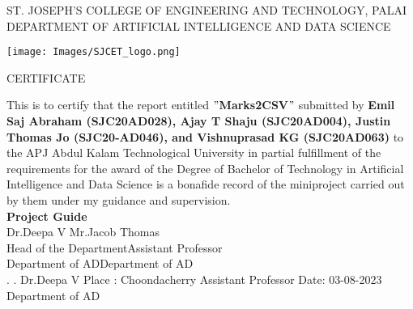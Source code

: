 \thispagestyle{empty}
\begin{center}
\normalsize{ST. JOSEPH’S COLLEGE OF ENGINEERING AND TECHNOLOGY, PALAI}\\[0.5cm]
\normalsize
 { DEPARTMENT OF ARTIFICIAL INTELLIGENCE AND DATA SCIENCE}\\[1.0cm]%
   \begin{center}
   \texttt{[image: Images/SJCET\_logo.png]}
   \end{center}
{\large CERTIFICATE}\\[1.5cm]
\end{center}
\normalsize 
This is to certify that the report entitled {\bf $"$Marks2CSV$"$} submitted by { \bf Emil Saj Abraham (SJC20AD028), Ajay T Shaju (SJC20AD004), Justin Thomas Jo (SJC20-AD046), and Vishnuprasad KG (SJC20AD063)} to the APJ Abdul Kalam Technological University in partial fulfillment of the requirements for the award of the Degree of Bachelor of Technology in Artificial Intelligence and Data Science is a bonafide record of the miniproject carried out by them under my guidance and supervision.\vspace{1.3 cm}\\
{\bf Project Guide}\hspace{8.35 cm}{\bf Project Coordinator}\\
Dr.Deepa V\hspace{9.0 cm} Mr.Jacob Thomas\\
Head of the Department\hspace{6.85 cm}Assistant Professor\hspace{2.6 cm}\\Department of AD\hspace{7.9 cm}Department of AD
\vspace{1.3 cm}\\
.\hspace{11.06 cm}{\bf Head of the Department}
\newline
.\hspace{11.01 cm} Dr.Deepa V
\newline
Place : Choondacherry  \hspace{6.87 cm} Assistant Professor
\newline
Date\hspace{0.25 cm}: 03-08-2023 \hspace{7.7 cm} Department of AD      

\newpage

